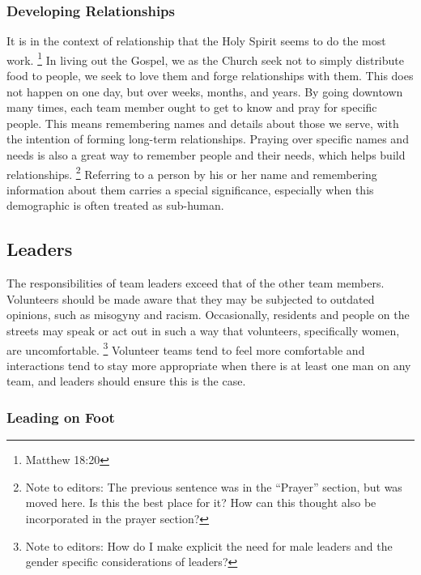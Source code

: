 \documentclass[12pt]{article}
\begin{document}
\subsubsection{Developing Relationships}

    \qPiperCoronary
    It is in the context of relationship that the Holy Spirit seems to do the most work.
    \footnote{Matthew 18:20}
    In living out the Gospel, we as the Church seek not to simply distribute food to people, we seek to love them and forge relationships with them.
    This does not happen on one day, but over weeks, months, and years.
    By going downtown many times, each team member ought to get to know and pray for specific people.
    This means remembering names and details about those we serve, with the intention of forming long-term relationships.
    Praying over specific names and needs is also a great way to remember people and their needs, which helps build relationships.
    \footnote{Note to editors: The previous sentence was in the ``Prayer'' section, but was moved here. Is this the best place for it? How can this thought also be incorporated in the prayer section?}
    Referring to a person by his or her name and remembering information about them carries a special significance, especially when this demographic is often treated as sub-human.

\subsection{Leaders}

    The responsibilities of team leaders exceed that of the other team members.
    Volunteers should be made aware that they may be subjected to outdated opinions, such as misogyny and racism.
    Occasionally, residents and people on the streets may speak or act out in such a way that volunteers, specifically women, are uncomfortable.
    \footnote{Note to editors: How do I make explicit the need for male leaders and the gender specific considerations of leaders?}
    Volunteer teams tend to feel more comfortable and interactions tend to stay more appropriate when there is at least one man on any team, and leaders should ensure this is the case.

\subsubsection{Leading on Foot}
\end{document}

